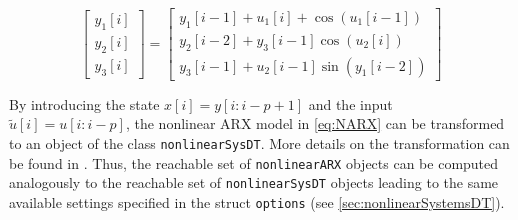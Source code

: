 \begin{center}
\begin{minipage}[t]{0.48\textwidth}
	\vspace{10pt}
	\begin{equation*}
	\begin{bmatrix} y_1[i] \\ y_2[i] \\ y_3[i] \end{bmatrix} = \begin{bmatrix} y_1[i-1] + u_1[i] + \cos(u_1[i-1]) \\ y_2[i-2] + y_3[i-1] \cos(u_2[i]) \\ y_3[i-1] + u_2[i-1] \sin(y_1[i-2]) \end{bmatrix}
\end{equation*}
\end{minipage}
\begin{minipage}[t]{0.48\textwidth}
	\footnotesize
	
\end{minipage}
\end{center}






By introducing the state $x[i] = y[i:i-p+1]$ and the input $\tilde{u}[i] = {u}[i:i-p]$, the nonlinear ARX model in \eqref{eq:NARX} can be transformed to an object of the class \texttt{nonlinearSysDT}.
More details on the transformation can be found in \cite{Luetzow2024b}. 
Thus, the reachable set of \texttt{nonlinearARX} objects can be computed analogously to the reachable set of \texttt{nonlinearSysDT} objects leading to the same available settings specified in the struct \texttt{options} (see \cref{sec:nonlinearSystemsDT}).



